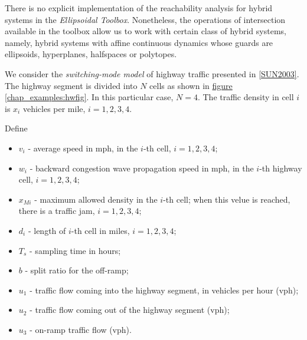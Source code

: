 \documentclass[letterpaper,10pt,english]{sphinxmanual}
\begin{document}
There is no explicit implementation of the reachability analysis for
hybrid systems in the \emph{Ellipsoidal Toolbox}. Nonetheless, the operations
of intersection available in the toolbox allow us to work with certain
class of hybrid systems, namely, hybrid systems with affine continuous
dynamics whose guards are ellipsoids, hyperplanes, halfspaces or
polytopes.

We consider the \emph{switching-mode model} of highway traffic presented in
{\hyperref[chap_examples:sun2003]{{[}SUN2003{]}}}. The highway segment is divided into \(N\)
cells as shown in \hyperref[chap_examples:hwfig]{figure  \ref*{chap_examples:hwfig}}. In this particular case, \(N=4\).
The traffic density in cell \(i\) is \(x_i\) vehicles per mile,
\(i=1,2,3,4\).

Define
\begin{itemize}
\item {} 
\(v_i\) - average speed in mph, in the \(i\)-th cell,
\(i=1,2,3,4\);

\item {} 
\(w_i\) - backward congestion wave propagation speed in mph, in
the \(i\)-th highway cell, \(i=1,2,3,4\);

\item {} 
\(x_{Mi}\) - maximum allowed density in the \(i\)-th cell;
when this velue is reached, there is a traffic jam,
\(i=1,2,3,4\);

\item {} 
\(d_i\) - length of \(i\)-th cell in miles,
\(i=1,2,3,4\);

\item {} 
\(T_s\) - sampling time in hours;

\item {} 
\(b\) - split ratio for the off-ramp;

\item {} 
\(u_1\) - traffic flow coming into the highway segment, in
vehicles per hour (vph);

\item {} 
\(u_2\) - traffic flow coming out of the highway segment (vph);

\item {} 
\(u_3\) - on-ramp traffic flow (vph).

\end{itemize}
\end{document}
